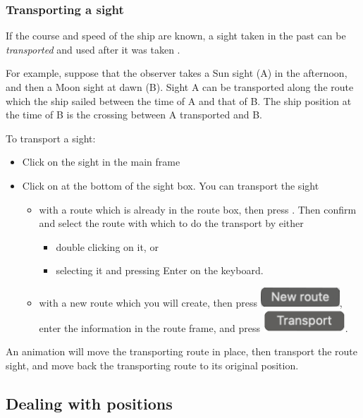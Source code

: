 \documentclass{ol-softwaremanual}
\begin{document}
\subsubsection{Transporting a sight}\label{section-transporting-sight}

If the course and speed of the ship are known, a sight taken in the past can be \textit{transported} and used after it was taken \cite{bowditch2002the,noauthor2017cours}. 

For example, suppose that the observer takes a Sun sight (A) in the afternoon, and then a Moon sight at dawn (B). Sight A can be transported along the route which the ship sailed between the time of A and that of B. The ship position at the time of B is the crossing between A transported and B. 

To transport a sight: 
\begin{itemize}
\item Click on the sight in the main frame
\item Click on  at the bottom of the sight box. You can transport the sight
\begin{itemize}
\item with a route which is already in the route box, then press . Then confirm and select the route with which to do the transport by either
\begin{itemize}
  \item double clicking on it, or
  \item selecting it and pressing Enter on the keyboard. 
\end{itemize}
\item with a new route which you will create, then press \includegraphics{figures/new-route-button.png}, enter the information in the route frame, and press \includegraphics{figures/routeframe-transport-button.png}. 
\end{itemize}
\end{itemize}
An animation will move the transporting route in place, then transport the route sight, and move back the transporting route to its original position. 


\subsection{Dealing with positions}\label{section-position}
\end{document}
